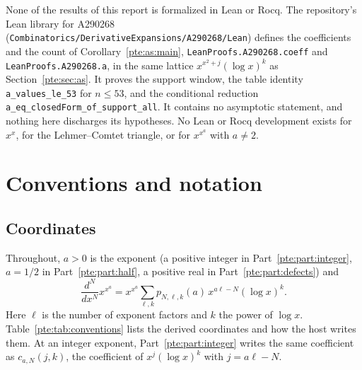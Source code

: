 \documentclass[11pt,a4paper]{article}
\numberwithin{equation}{section}
\theoremstyle{definition}
\theoremstyle{plain}
\begin{document}
None of the results of this report is formalized in Lean or Rocq. The repository's Lean library for A290268 (\texttt{Combinatorics/\allowbreak{}DerivativeExpansions/\allowbreak{}A290268/\allowbreak{}Lean}) defines the coefficients and the count of Corollary~\ref{pte:as:main}, \texttt{LeanProofs.\allowbreak{}A290268.\allowbreak{}coeff} and \texttt{LeanProofs.\allowbreak{}A290268.\allowbreak{}a}, in the same lattice $x^{x^2+j}(\log x)^k$ as Section~\ref{pte:sec:as}. It proves the support window, the table identity \texttt{a\_\allowbreak{}values\_\allowbreak{}le\_\allowbreak{}53} for $n\le53$, and the conditional reduction \texttt{a\_\allowbreak{}eq\_\allowbreak{}closedForm\_\allowbreak{}of\_\allowbreak{}support\_\allowbreak{}all}. It contains no asymptotic statement, and nothing here discharges its hypotheses. No Lean or Rocq development exists for $x^x$, for the Lehmer--Comtet triangle, or for $x^{x^a}$ with $a\ne2$.

\section{Conventions and notation}\label{pte:sec:conventions}
\subsection{Coordinates}
Throughout, $a>0$ is the exponent (a positive integer in Part~\ref{pte:part:integer}, $a=1/2$ in Part~\ref{pte:part:half}, a positive real in Part~\ref{pte:part:defects}) and
\[
 \frac{d^N}{dx^N}x^{x^a}=x^{x^a}\sum_{\ell,k}p_{N,\ell,k}(a)\,x^{a\ell-N}(\log x)^k .
\]
Here $\ell$ is the number of exponent factors and $k$ the power of $\log x$. Table~\ref{pte:tab:conventions} lists the derived coordinates and how the host writes them. At an integer exponent, Part~\ref{pte:part:integer} writes the same coefficient as $c_{a,N}(j,k)$, the coefficient of $x^j(\log x)^k$ with $j=a\ell-N$.
\end{document}

